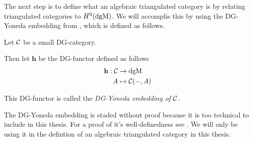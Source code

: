     
    





The next step is to define what an algebraic triangulated category is by relating triangulated categories to \( H^0(\operatorname{dgM}) \). We will accomplis this by using the DG-Yoneda embedding from \cite[Corollary 6.3.6]{Borceux_1994}, which is defined as follows.
\begin{definition}
    \label{def:DG_Yoneda_embedding}
    Let \( {\mathcal{C}} \) be a small DG-category.
    
    Then let \( \mathbf{h} \) be the DG-functor defined as follows
    \begin{align*}
        \mathbf{h}: {\mathcal{C}} &\to \operatorname{dgM} \\
        A &\mapsto {\mathcal{C}}(-, A)
    \end{align*}

    This DG-functor is called the \emph{DG-Yoneda embedding of \( {\mathcal{C}} \)}.
\end{definition}

The DG-Yoneda embedding is staded without proof because it is too technical to include in this thesis. For a proof of it's well-definedness see \cite[Corollary 6.3.6]{Borceux_1994}. We will only be using it in the defintion of an algebraic triangulated category in this thesis.

